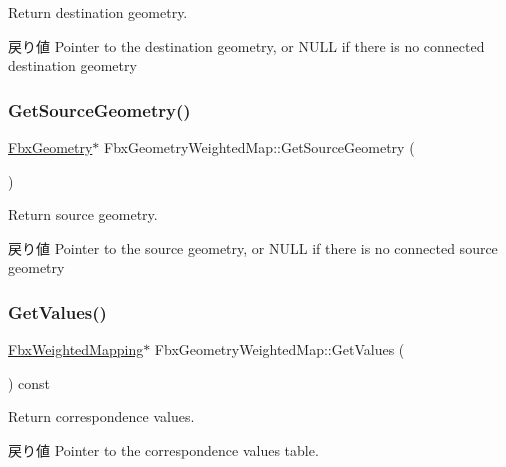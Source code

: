 Return destination geometry. \begin{DoxyReturn}{戻り値}
Pointer to the destination geometry, or {\ttfamily N\+U\+LL} if there is no connected destination geometry 
\end{DoxyReturn}
\mbox{\label{class_fbx_geometry_weighted_map_a5177720946120c17fe2003a979256e00}} 
\subsubsection{\texorpdfstring{Get\+Source\+Geometry()}{GetSourceGeometry()}}
{\footnotesize\ttfamily \hyperlink{class_fbx_geometry}{Fbx\+Geometry}$\ast$ Fbx\+Geometry\+Weighted\+Map\+::\+Get\+Source\+Geometry (\begin{DoxyParamCaption}{ }\end{DoxyParamCaption})}

Return source geometry. \begin{DoxyReturn}{戻り値}
Pointer to the source geometry, or {\ttfamily N\+U\+LL} if there is no connected source geometry 
\end{DoxyReturn}
\mbox{\label{class_fbx_geometry_weighted_map_a55d4ce89b77af065e73c32b9e5bd17e5}} 
\subsubsection{\texorpdfstring{Get\+Values()}{GetValues()}}
{\footnotesize\ttfamily \hyperlink{class_fbx_weighted_mapping}{Fbx\+Weighted\+Mapping}$\ast$ Fbx\+Geometry\+Weighted\+Map\+::\+Get\+Values (\begin{DoxyParamCaption}{ }\end{DoxyParamCaption}) const}

Return correspondence values. \begin{DoxyReturn}{戻り値}
Pointer to the correspondence values table. 
\end{DoxyReturn}
\mbox{\label{class_fbx_geometry_weighted_map_a42bb06040581c024f72d39e6a4318f4f}} 
